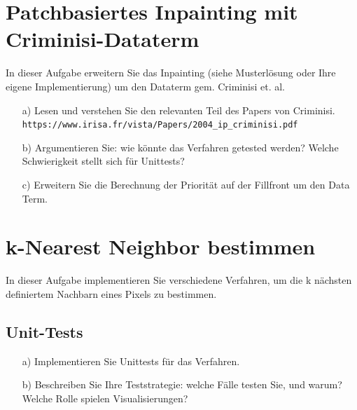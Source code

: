 \def\firstname{Tim}
\def\lastname{Dahmen}
\def\aufgabenblatt{5}




\thispagestyle{page1} 

\section{Patchbasiertes Inpainting mit Criminisi-Dataterm}

In dieser Aufgabe erweitern Sie das Inpainting (siehe Musterlösung oder Ihre eigene Implementierung) um den Dataterm gem. Criminisi et. al. 	

\begin{enumerate}

\item[a)] Lesen und verstehen Sie den relevanten Teil des Papers von Criminisi. \\ \texttt{https://www.irisa.fr/vista/Papers/2004\_ip\_criminisi.pdf}

\item[b)] Argumentieren Sie: wie könnte das Verfahren getested werden? Welche Schwierigkeit stellt sich für Unittests?

\item[c)] Erweitern Sie die Berechnung der Priorität auf der Fillfront um den Data Term.

\end{enumerate}

\section{k-Nearest Neighbor bestimmen}

In dieser Aufgabe implementieren Sie verschiedene Verfahren, um die k nächsten definiertem Nachbarn eines Pixels zu bestimmen. 

\subsection{Unit-Tests}

\begin{enumerate}

\item[a)] Implementieren Sie Unittests für das Verfahren.

\item[b)] Beschreiben Sie Ihre Teststrategie: welche Fälle testen Sie, und warum? Welche Rolle spielen Visualisierungen?

\end{enumerate}

